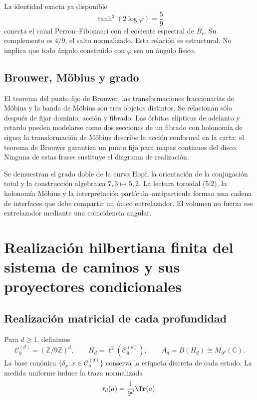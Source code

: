 La identidad exacta ya disponible
\[
\tanh^2(2\log\varphi)=\frac59
\]
conecta el canal Perron--Fibonacci con el cociente espectral de \(B_c\). Su
complemento es \(4/9\), el salto normalizado. Esta relación es estructural.
No implica que todo ángulo construido con \(\varphi\) sea un ángulo físico.

\subsection{Brouwer, Möbius y grado}

El teorema del punto fijo de Brouwer, las transformaciones fraccionarias de
Möbius y la banda de Möbius son tres objetos distintos. Se relacionan sólo
después de fijar dominio, acción y fibrado. Las órbitas elípticas de adelanto y
retardo pueden modelarse como dos secciones de un fibrado con holonomía de
signo; la transformación de Möbius describe la acción conformal en la carta;
el teorema de Brouwer garantiza un punto fijo para mapas continuos del disco.
Ninguna de estas frases sustituye el diagrama de realización.

\begin{fronteraBox}[title={Resultado y frontera}]
Se demuestran el grado doble de la curva Hopf, la orientación de la
conjugación total y la construcción algebraica \(7,3\mapsto5,2\). La lectura
toroidal (5{:}2), la holonomía Möbius y la interpretación
partícula--antipartícula forman una cadena de interfaces que debe compartir un
único entrelazador. El volumen no fuerza ese entrelazador mediante una
coincidencia angular.
\end{fronteraBox}


\section{Realización hilbertiana finita del sistema de caminos y sus proyectores condicionales}

\subsection{Realización matricial de cada profundidad}

Para \(d\ge1\), definimos
\[
  \mathcal C_9^{(d)}=(\mathbb Z/9\mathbb Z)^d,
  \qquad
  H_d=\ell^2(\mathcal C_9^{(d)}),
  \qquad
  A_d=B(H_d)\cong M_{9^d}(\mathbb C).
\]
La base canónica \(\{\delta_x:x\in\mathcal C_9^{(d)}\}\) conserva la
etiqueta discreta de cada estado. La medida uniforme induce la traza
normalizada
\[
  \tau_d(a)=\frac{1}{9^d}\Tr(a).
\]

